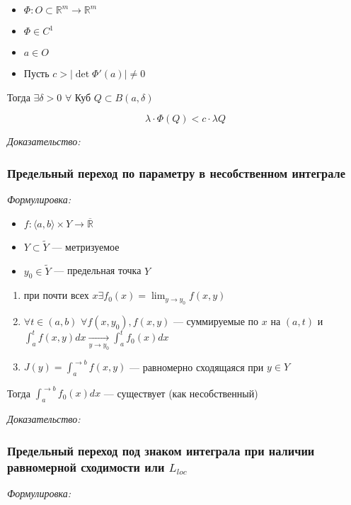 \documentclass{article}
\def\dbl{\,\,}
\def\rinf{\overline{\mathbb{R}}}
\def\goesto#1{\underset{#1}{\longrightarrow}}
\begin{document}
\begin{itemize}
    \item $\Phi: O \subset \mathbb{R}^{m} \rightarrow \mathbb{R}^{m}$
    \item $\Phi \in C^{1}$
    \item $a \in O$
    \item Пусть $c > |\det \Phi'(a)| \neq 0$
\end{itemize}

Тогда $\exists \delta > 0 \dbl \forall$ Куб $Q \subset B(a, \delta)$

\[\lambda \cdot \Phi(Q) < c \cdot \lambda Q\]

\textit{Доказательство:}

\subsubsection{Предельный переход по параметру в несобственном интеграле}
\textit{Формулировка:}

\begin{itemize}
    \item $f: \langle a, b \rangle \times Y \rightarrow \rinf$
    \item $Y \subset \tilde{Y}$ --- метризуемое
    \item $y_0 \in \tilde{Y}$ --- предельная точка $Y$
\end{itemize}

\begin{enumerate}
    \item при почти всех $x \exists f_0(x) = \lim_{y \rightarrow y_0} f(x, y)$
    \item $\forall t \in (a, b) \dbl \forall f(x, y_0), f(x, y)$ --- суммируемые по $x$ на $(a, t)$ и $\int_a^{t} f(x, y) dx \goesto{y \rightarrow y_0} \int_a^{t} f_0(x) dx$
    \item $J(y) = \int_a^{\rightarrow b} f(x, y)$ --- равномерно сходящаяся при $y \in Y$
\end{enumerate}

Тогда $\int_a^{\rightarrow b} f_0(x) dx$ --- существует (как несобственный)

\textit{Доказательство:}


\subsubsection{Предельный переход под знаком интеграла при наличии равномерной сходимости или $L_{loc}$}
\textit{Формулировка:}
\end{document}
